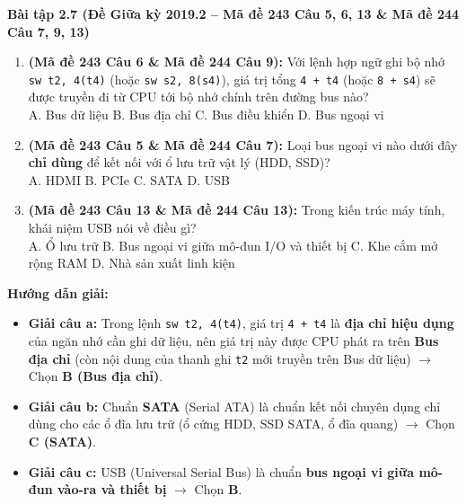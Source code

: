 \textbf{Bài tập 2.7 (Đề Giữa kỳ 2019.2 -- Mã đề 243 Câu 5, 6, 13 \& Mã đề 244 Câu 7, 9, 13)}
\begin{enumerate}[label=\alph*)]
    \item \textbf{(Mã đề 243 Câu 6 \& Mã đề 244 Câu 9):} Với lệnh hợp ngữ ghi bộ nhớ \texttt{sw t2, 4(t4)} (hoặc \texttt{sw s2, 8(s4)}), giá trị tổng \texttt{4 + t4} (hoặc \texttt{8 + s4}) sẽ được truyền đi từ CPU tới bộ nhớ chính trên đường bus nào?\\
    A. Bus dữ liệu \quad B. Bus địa chỉ \quad C. Bus điều khiển \quad D. Bus ngoại vi
    \item \textbf{(Mã đề 243 Câu 5 \& Mã đề 244 Câu 7):} Loại bus ngoại vi nào dưới đây \textbf{chỉ dùng} để kết nối với ổ lưu trữ vật lý (HDD, SSD)?\\
    A. HDMI \quad B. PCIe \quad C. SATA \quad D. USB
    \item \textbf{(Mã đề 243 Câu 13 \& Mã đề 244 Câu 13):} Trong kiến trúc máy tính, khái niệm USB nói về điều gì?\\
    A. Ổ lưu trữ \quad B. Bus ngoại vi giữa mô-đun I/O và thiết bị \quad C. Khe cắm mở rộng RAM \quad D. Nhà sản xuất linh kiện
\end{enumerate}
\textbf{Hướng dẫn giải:}
\begin{itemize}
    \item \textbf{Giải câu a:} Trong lệnh \texttt{sw t2, 4(t4)}, giá trị \texttt{4 + t4} là \textbf{địa chỉ hiệu dụng} của ngăn nhớ cần ghi dữ liệu, nên giá trị này được CPU phát ra trên \textbf{Bus địa chỉ} (còn nội dung của thanh ghi \texttt{t2} mới truyền trên Bus dữ liệu) $\rightarrow$ Chọn \textbf{B (Bus địa chỉ)}.
    \item \textbf{Giải câu b:} Chuẩn \textbf{SATA} (Serial ATA) là chuẩn kết nối chuyên dụng chỉ dùng cho các ổ đĩa lưu trữ (ổ cứng HDD, SSD SATA, ổ đĩa quang) $\rightarrow$ Chọn \textbf{C (SATA)}.
    \item \textbf{Giải câu c:} USB (Universal Serial Bus) là chuẩn \textbf{bus ngoại vi giữa mô-đun vào-ra và thiết bị} $\rightarrow$ Chọn \textbf{B}.
\end{itemize}

